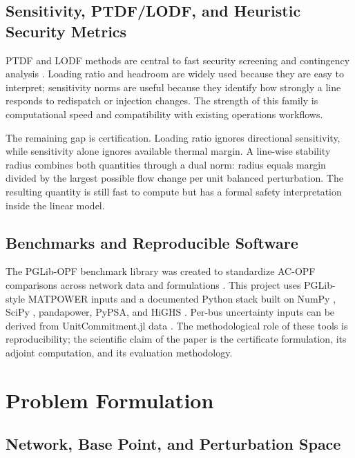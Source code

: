 \documentclass[11pt]{article}
\begin{document}
\subsection{Sensitivity, PTDF/LODF, and Heuristic Security Metrics}

PTDF and LODF methods are central to fast security screening and contingency analysis \citep{WoodWollenbergSheble2013}. Loading ratio and headroom are widely used because they are easy to interpret; sensitivity norms are useful because they identify how strongly a line responds to redispatch or injection changes. The strength of this family is computational speed and compatibility with existing operations workflows.

The remaining gap is certification. Loading ratio ignores directional sensitivity, while sensitivity alone ignores available thermal margin. A line-wise stability radius combines both quantities through a dual norm: radius equals margin divided by the largest possible flow change per unit balanced perturbation. The resulting quantity is still fast to compute but has a formal safety interpretation inside the linear model.

\subsection{Benchmarks and Reproducible Software}

The PGLib-OPF benchmark library was created to standardize AC-OPF comparisons across network data and formulations \citep{PGLibOPF2019}. This project uses PGLib-style MATPOWER inputs and a documented Python stack built on NumPy \citep{HarrisEtAl2020}, SciPy \citep{VirtanenEtAl2020}, pandapower, PyPSA, and HiGHS \citep{HiGHS2026}. Per-bus uncertainty inputs can be derived from UnitCommitment.jl data \citep{UnitCommitmentJL2024}. The methodological role of these tools is reproducibility; the scientific claim of the paper is the certificate formulation, its adjoint computation, and its evaluation methodology.

\section{Problem Formulation}
\label{sec:formulation}

\subsection{Network, Base Point, and Perturbation Space}
\end{document}

